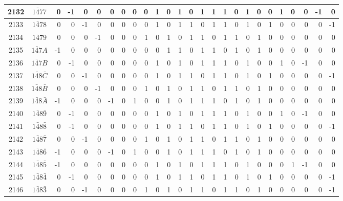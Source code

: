 \documentclass[12 pt]{article}%
\begin{document}
\begin{tiny}
\begin{centering}
\begin{longtable}{|c|c||rrrrrrrrrrrrrrrrrrrrrrrr|}
      \hline
      2132 & $1\bar477$ & 0 & -1 & 0 & 0 & 0 & 0 & 0 & 0 & 1 & 0 & 1 & 0 & 1 & 1 & 1 & 0 & 1 & 0 & 0 & 1 & 0 & 0 & -1 & 0 \\
      \hline
      2133 & $1\bar478$ & 0 & 0 & -1 & 0 & 0 & 0 & 0 & 0 & 1 & 0 & 1 & 1 & 0 & 1 & 1 & 0 & 1 & 0 & 1 & 0 & 0 & 0 & 0 & -1 \\
      \hline
      2134 & $1\bar479$ & 0 & 0 & 0 & -1 & 0 & 0 & 0 & 1 & 0 & 1 & 0 & 1 & 1 & 0 & 1 & 1 & 0 & 1 & 0 & 0 & 0 & 0 & 0 & 0 \\
      \hline
      2135 & $1\bar47A$ & -1 & 0 & 0 & 0 & 0 & 0 & 0 & 0 & 0 & 1 & 1 & 0 & 1 & 1 & 0 & 1 & 0 & 1 & 0 & 0 & 0 & 0 & 0 & 0 \\
      \hline
      2136 & $1\bar47B$ & 0 & -1 & 0 & 0 & 0 & 0 & 0 & 0 & 1 & 0 & 1 & 0 & 1 & 1 & 1 & 0 & 1 & 0 & 0 & 1 & 0 & -1 & 0 & 0 \\
      \hline
      2137 & $1\bar48\bar C$ & 0 & 0 & -1 & 0 & 0 & 0 & 0 & 0 & 1 & 0 & 1 & 1 & 0 & 1 & 1 & 0 & 1 & 0 & 1 & 0 & 0 & 0 & 0 & -1 \\
      \hline
      2138 & $1\bar48\bar B$ & 0 & 0 & 0 & -1 & 0 & 0 & 0 & 1 & 0 & 1 & 0 & 1 & 1 & 0 & 1 & 1 & 0 & 1 & 0 & 0 & 0 & 0 & 0 & 0 \\
      \hline
      2139 & $1\bar48\bar A$ & -1 & 0 & 0 & 0 & -1 & 0 & 1 & 0 & 0 & 1 & 0 & 1 & 1 & 1 & 0 & 1 & 0 & 1 & 0 & 0 & 0 & 0 & 0 & 0 \\
      \hline
      2140 & $1\bar48\bar9$ & 0 & -1 & 0 & 0 & 0 & 0 & 0 & 0 & 1 & 0 & 1 & 0 & 1 & 1 & 1 & 0 & 1 & 0 & 0 & 1 & 0 & -1 & 0 & 0 \\
      \hline
      2141 & $1\bar48\bar8$ & 0 & -1 & 0 & 0 & 0 & 0 & 0 & 0 & 1 & 0 & 1 & 1 & 0 & 1 & 1 & 0 & 1 & 0 & 1 & 0 & 0 & 0 & 0 & -1 \\
      \hline
      2142 & $1\bar48\bar7$ & 0 & 0 & -1 & 0 & 0 & 0 & 0 & 1 & 0 & 1 & 0 & 1 & 1 & 0 & 1 & 1 & 0 & 1 & 0 & 0 & 0 & 0 & 0 & 0 \\
      \hline
      2143 & $1\bar48\bar6$ & -1 & 0 & 0 & 0 & -1 & 0 & 1 & 0 & 0 & 1 & 0 & 1 & 1 & 1 & 0 & 1 & 0 & 1 & 0 & 0 & 0 & 0 & 0 & 0 \\
      \hline
      2144 & $1\bar48\bar5$ & -1 & 0 & 0 & 0 & 0 & 0 & 0 & 0 & 1 & 0 & 1 & 0 & 1 & 1 & 1 & 0 & 1 & 0 & 0 & 0 & 1 & -1 & 0 & 0 \\
      \hline
      2145 & $1\bar48\bar4$ & 0 & -1 & 0 & 0 & 0 & 0 & 0 & 0 & 1 & 0 & 1 & 1 & 0 & 1 & 1 & 0 & 1 & 0 & 1 & 0 & 0 & 0 & 0 & -1 \\
      \hline
      2146 & $1\bar48\bar3$ & 0 & 0 & -1 & 0 & 0 & 0 & 0 & 1 & 0 & 1 & 0 & 1 & 1 & 0 & 1 & 1 & 0 & 1 & 0 & 0 & 0 & 0 & 0 & -1 \\

\end{longtable}
\end{centering}
\end{tiny}
\end{document}
